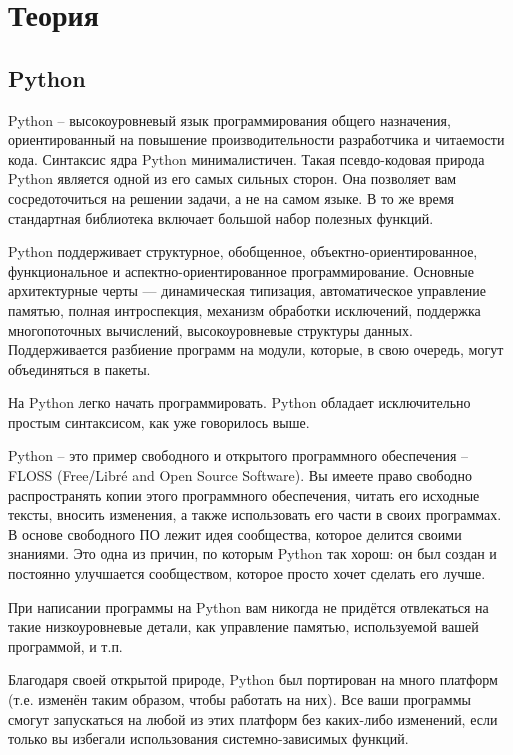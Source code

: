 \documentclass[11pt,a4paper]{report}
\begin{document}
\tableofcontents
\newpage
\section{Теория}
\subsection{Python}

Python – высокоуровневый язык программирования общего назначения, ориентированный на повышение производительности разработчика и читаемости кода. Синтаксис ядра Python минималистичен. Такая псевдо-кодовая природа Python является одной из его самых сильных сторон. Она позволяет вам сосредоточиться на решении задачи, а не на самом языке. В то же время стандартная библиотека включает большой набор полезных функций.

Python поддерживает структурное, обобщенное, объектно-ориентированное, функциональное и аспектно-ориентированное программирование. Основные архитектурные черты — динамическая типизация, автоматическое управление памятью, полная интроспекция, механизм обработки исключений, поддержка многопоточных вычислений, высокоуровневые структуры данных. Поддерживается разбиение программ на модули, которые, в свою очередь, могут объединяться в пакеты.

На Python легко начать программировать. Python обладает исключительно простым синтаксисом, как уже говорилось выше.

Python – это пример свободного и открытого программного обеспечения –FLOSS (Free/Libré and Open Source Software). Вы имеете право свободно распространять копии этого программного обеспечения, читать его исходные тексты, вносить изменения, а также использовать его части в своих программах. В основе свободного ПО лежит идея сообщества, которое делится своими знаниями. Это одна из причин, по которым Python так хорош: он был создан и постоянно улучшается сообществом, которое просто хочет сделать его лучше.

При написании программы на Python вам никогда не придётся отвлекаться на такие низкоуровневые детали, как управление памятью, используемой вашей программой, и т.п.

Благодаря своей открытой природе, Python был портирован на много платформ (т.е. изменён таким образом, чтобы работать на них). Все ваши программы смогут запускаться на любой из этих платформ без каких-либо изменений, если только вы избегали использования системно-зависимых функций.
\end{document}
